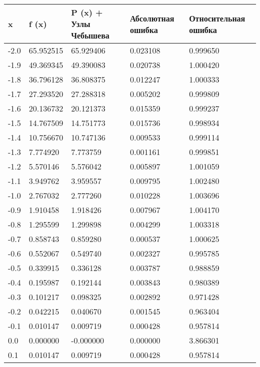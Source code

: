 \documentclass[13pt, a4paper, twoside]{article}
\begin{document}
\begin{table}[!ht]
    \centering
    \begin{tabular}{|l|l|l|l|l|}
    \hline
        x & f (x) & P (x) + Узлы Чебышева & Абсолютная ошибка & Относительная ошибка \\ \hline
        -2.0 & 65.952515 & 65.929406 & 0.023108 & 0.999650 \\ \hline
        -1.9 & 49.369345 & 49.390083 & 0.020738 & 1.000420 \\ \hline
        -1.8 & 36.796128 & 36.808375 & 0.012247 & 1.000333 \\ \hline
        -1.7 & 27.293520 & 27.288318 & 0.005202 & 0.999809 \\ \hline
        -1.6 & 20.136732 & 20.121373 & 0.015359 & 0.999237 \\ \hline
        -1.5 & 14.767509 & 14.751773 & 0.015736 & 0.998934 \\ \hline
        -1.4 & 10.756670 & 10.747136 & 0.009533 & 0.999114 \\ \hline
        -1.3 & 7.774920 & 7.773759 & 0.001161 & 0.999851 \\ \hline
        -1.2 & 5.570146 & 5.576042 & 0.005897 & 1.001059 \\ \hline
        -1.1 & 3.949762 & 3.959557 & 0.009795 & 1.002480 \\ \hline
        -1.0 & 2.767032 & 2.777260 & 0.010228 & 1.003696 \\ \hline
        -0.9 & 1.910458 & 1.918426 & 0.007967 & 1.004170 \\ \hline
        -0.8 & 1.295599 & 1.299898 & 0.004299 & 1.003318 \\ \hline
        -0.7 & 0.858743 & 0.859280 & 0.000537 & 1.000625 \\ \hline
        -0.6 & 0.552067 & 0.549740 & 0.002327 & 0.995785 \\ \hline
        -0.5 & 0.339915 & 0.336128 & 0.003787 & 0.988859 \\ \hline
        -0.4 & 0.195987 & 0.192144 & 0.003843 & 0.980389 \\ \hline
        -0.3 & 0.101217 & 0.098325 & 0.002892 & 0.971428 \\ \hline
        -0.2 & 0.042215 & 0.040670 & 0.001545 & 0.963404 \\ \hline
        -0.1 & 0.010147 & 0.009719 & 0.000428 & 0.957814 \\ \hline
        0.0 & 0.000000 & -0.000000 & 0.000000 & 3.866301 \\ \hline
        0.1 & 0.010147 & 0.009719 & 0.000428 & 0.957814 \\ \hline

\end{tabular}
\end{table}
\end{document}
